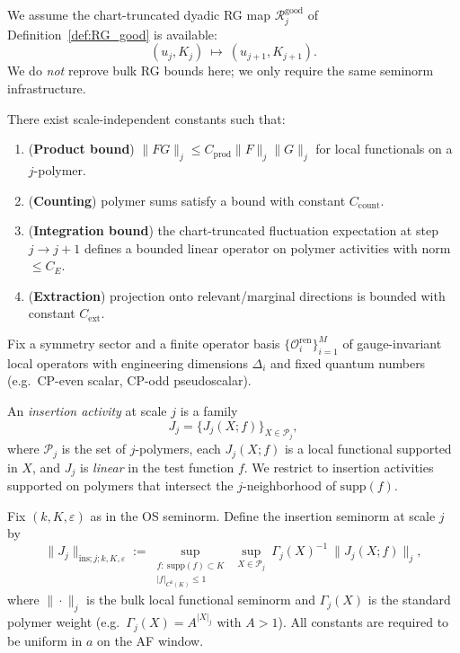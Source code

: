 We assume the chart-truncated dyadic RG map $\mathcal R^{\mathrm{good}}_j$ of Definition~\ref{def:RG_good} is available:
\[
(u_j,K_j)\ \mapsto\ (u_{j+1},K_{j+1}).
\]
We do \emph{not} reprove bulk RG bounds here; we only require the same seminorm infrastructure.

\begin{proposition}\label{ass:bulk_axioms}
There exist scale-independent constants such that:
\begin{enumerate}[label=(B\arabic*)]
\item (\textbf{Product bound}) $\|FG\|_j\le C_{\mathrm{prod}}\|F\|_j\|G\|_j$ for local functionals on a $j$-polymer.
\item (\textbf{Counting}) polymer sums satisfy a bound with constant $C_{\mathrm{count}}$.
\item (\textbf{Integration bound}) the chart-truncated fluctuation expectation at step $j\to j+1$ defines a bounded linear operator on polymer activities with norm $\le C_E$.
\item (\textbf{Extraction}) projection onto relevant/marginal directions is bounded with constant $C_{\mathrm{ext}}$.
\end{enumerate}
\end{proposition}

Fix a symmetry sector and a finite operator basis $\{\mathcal O_i^{\mathrm{ren}}\}_{i=1}^M$ of gauge-invariant local operators
with engineering dimensions $\Delta_i$ and fixed quantum numbers (e.g.\ CP-even scalar, CP-odd pseudoscalar).

An \emph{insertion activity} at scale $j$ is a family
\[
J_j=\{J_j(X;f)\}_{X\in\mathscr P_j},
\]
where $\mathscr P_j$ is the set of $j$-polymers, each $J_j(X;f)$ is a local functional supported in $X$, and $J_j$ is \emph{linear} in the test function $f$.
We restrict to insertion activities supported on polymers that intersect the $j$-neighborhood of $\mathrm{supp}(f)$.

Fix $(k,K,\varepsilon)$ as in the OS seminorm. Define the insertion seminorm at scale $j$ by
\begin{equation}\label{eq:ins_norm}
\|J_j\|_{\mathrm{ins};j;k,K,\varepsilon}
:=
\sup_{\substack{f:\ \mathrm{supp}(f)\subset K\\ |f|_{C^k(K)}\le 1}}
\ \sup_{X\in\mathscr P_j}\ 
\Gamma_j(X)^{-1}\ \|J_j(X;f)\|_j,
\end{equation}
where $\|\cdot\|_j$ is the bulk local functional seminorm and $\Gamma_j(X)$ is the standard polymer weight (e.g.\ $\Gamma_j(X)=A^{|X|_j}$ with $A>1$).
All constants are required to be uniform in $a$ on the AF window.

